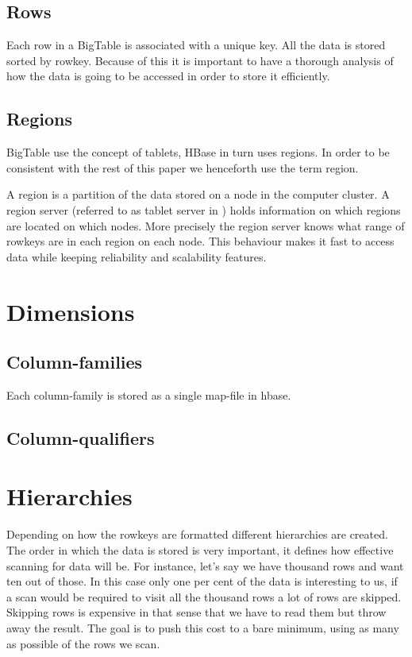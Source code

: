 \documentclass[a4paper,10pt]{book}
\begin{document}
\subsection{Rows}

Each row in a BigTable is associated with a unique key. All the data is
stored sorted by rowkey. Because of this it is important to have a thorough
analysis of how the data is going to be accessed in order to store it
efficiently.



\subsection{Regions}

BigTable use the concept of tablets, HBase in turn uses regions. In order
to be consistent with the rest of this paper we henceforth use the term
region.

A region is a partition of the data stored on a node in the computer
cluster. A region server (referred to as tablet server in \cite{mapreduce})
holds information on which regions are located on which nodes. More
precisely the region server knows what range of rowkeys are in each region
on each node. This behaviour makes it fast to access data while keeping
reliability and scalability features.



\section{Dimensions}

\subsection{Column-families}

Each column-family is stored as a single map-file in hbase.


\subsection{Column-qualifiers}



\section{Hierarchies}

Depending on how the rowkeys are formatted different hierarchies are
created. The order in which the data is stored is very important, it
defines how effective scanning for data will be. For instance, let's say we
have thousand rows and want ten out of those. In this case only one per
cent of the data is interesting to us, if a scan would be required to visit
all the thousand rows a lot of rows are skipped. Skipping rows is expensive
in that sense that we have to read them but throw away the result. The goal
is to push this cost to a bare minimum, using as many as possible of the
rows we scan.
\end{document}
